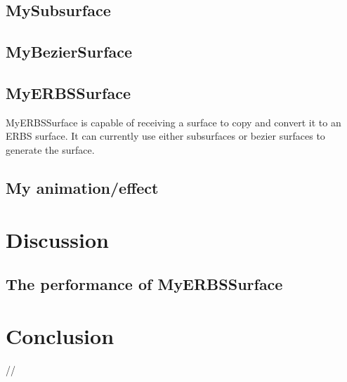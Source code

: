 \documentclass[a4paper,11pt]{article}
\begin{document}
\subsection{MySubsurface}
\subsection{MyBezierSurface}
\subsection{MyERBSSurface}
MyERBSSurface is capable of receiving a surface to copy and convert it to an ERBS surface. It can currently use either subsurfaces or bezier surfaces to generate the surface. 

\subsection{My animation/effect}

\section{Discussion}
\subsection{The performance of MyERBSSurface}


\section{Conclusion}
//

\end{document}
